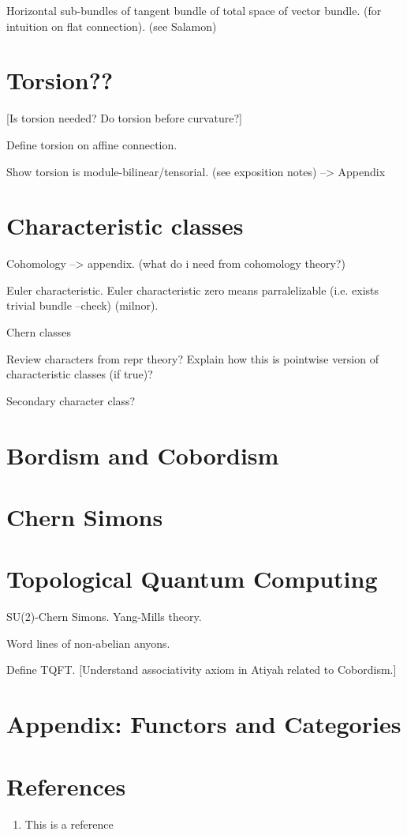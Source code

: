 \documentclass[a4paper]{article}
\theoremstyle{definition} \newtheorem*{definition}{Definition}
\theoremstyle{definition} \newtheorem*{definitions}{Definitions}
\theoremstyle{plain} \newtheorem{theorem}{Theorem}[section]
\theoremstyle{plain} \newtheorem{proposition}[theorem]{Proposition}
\theoremstyle{plain} \newtheorem{corollary}[theorem]{Corollary}
\theoremstyle{plain} \newtheorem{lemma}[theorem]{Lemma}
\theoremstyle{plain} \newtheorem{example}[theorem]{Example}
\begin{document}
Horizontal sub-bundles of tangent bundle of total space of vector bundle. (for intuition on flat connection). (see Salamon)



\section{Torsion??}
[Is torsion needed? Do torsion before curvature?]

Define torsion on affine connection. 

Show torsion is module-bilinear/tensorial. (see exposition notes) --> Appendix

\section{Characteristic classes}
Cohomology --> appendix. (what do i need from cohomology theory?)

Euler characteristic. Euler characteristic zero means parralelizable (i.e. exists trivial bundle --check) (milnor).

Chern classes

Review characters from repr theory? Explain how this is pointwise version of characteristic classes (if true)?

Secondary character class?

\section{Bordism and Cobordism}

\section{Chern Simons}


\section{Topological Quantum Computing}
SU(2)-Chern Simons. Yang-Mills theory.

Word lines of non-abelian anyons.

Define TQFT. [Understand associativity axiom in Atiyah related to Cobordism.]

\section{Appendix: Functors and Categories}

\section*{References}
\begin{enumerate}
\item This is a reference
\end{enumerate}
\end{document}
